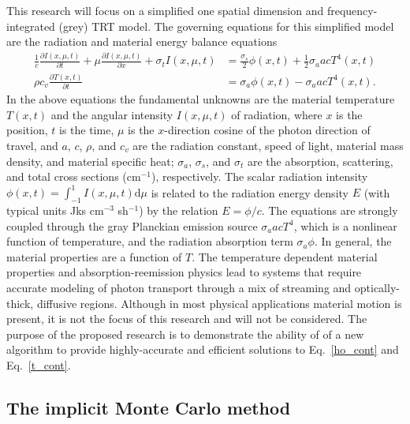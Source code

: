 \documentclass[11pt]{article}
\newcommand{\pderiv}[2]{\frac{\partial #1}{\partial #2}}
\renewcommand{\d}{\mathrm{d}}
\begin{document}
 This research will focus on a simplified one spatial dimension and
 frequency-integrated (grey) TRT model.  The governing equations for this simplified model are the radiation and material
 energy balance equations~\cite{something}
\begin{align}\label{ho_cont}
    \frac{1}{c}\pderiv{I(x,\mu,t)}{t} + \mu \pderiv{I(x,\mu,t)}{x} + \sigma_t
    I(x,\mu,t)
&= \frac{\sigma_s}{2} \phi(x,t) +\frac{1}{2} \sigma_a a c T^4(x,t)
    \\ \label{t_cont}
  \rho c_v \pderiv{T(x,t)}{t} &=  \sigma_a \phi(x,t) - \sigma_a a c T^4(x,t).
\end{align}
In the above equations the fundamental unknowns are the material temperature $T(x,t)$ and
the angular intensity $I(x,\mu,t)$ of radiation, where $x$ is the position, $t$ is the time, $\mu$ is
the $x$-direction cosine of the photon direction of travel, and $a$, $c$, $\rho$,
and
$c_v$ are the radiation constant, speed of light, material mass density, and material specific heat; $\sigma_a$, $\sigma_s$, and
$\sigma_t$ are the absorption, scattering, and total
cross sections (cm$^{-1}$), respectively.  The scalar radiation intensity $\phi(x,t)=\int_{-1}^1
I(x,\mu,t) \d \mu$ is related to the radiation energy density
$E$ (with typical units Jks cm$^{-3}$ sh$^{-1}$) by the relation $E = \phi/c$.   The equations are
strongly coupled through the gray Planckian emission source $\sigma_a a c T^4$, which
is a nonlinear function of temperature, and the radiation absorption
term $\sigma_a \phi$.  In general, the material properties are a function of $T$.  The temperature dependent material properties and
absorption-reemission physics lead to systems that require accurate modeling of
photon transport through a  mix of
streaming and optically-thick, diffusive regions.  Although in most physical
applications material motion is present, it is not the focus of this research and will not
be considered.  The purpose of the proposed research is to demonstrate the ability of 
of a new algorithm to provide highly-accurate and efficient solutions to
Eq.~\eqref{ho_cont} and Eq.~\eqref{t_cont}.

\subsection{The implicit Monte Carlo method}
\end{document}
